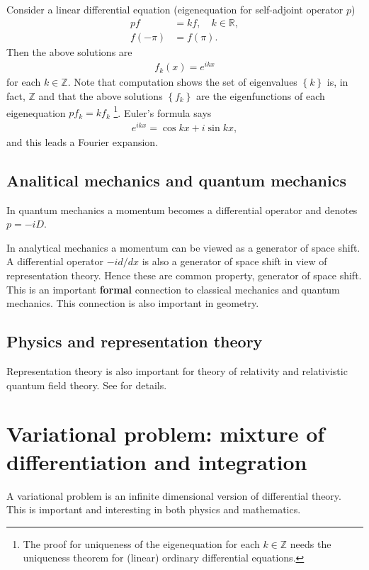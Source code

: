 \documentclass[openany, a4paper, oneside]{jsbook}
\theoremstyle{break}
\theoremstyle{breakdefn}
\newcommand{\cbk}[1]{\left\{#1\right\}}
\newcommand{\bbR}{\mathbb{R}}
\newcommand{\bbZ}{\mathbb{Z}}
\begin{document}
Consider a linear differential equation (eigenequation for
self-adjoint operator $p$)
\begin{align}
 p f
 &=
 k f, \quad k \in \bbR, \\
 f(-\pi)
 &=
 f(\pi).
\end{align}
Then the above solutions are
\begin{align}
 f_k(x)
 =
 e^{ikx}
\end{align}
for each $k \in \bbZ$.
Note that computation shows the set of eigenvalues $\cbk{k}$ is, in fact, $\bbZ$ and that
the above solutions $\cbk{f_k}$ are the eigenfunctions of each eigenequation $p f_k = k f_k$ \footnote{The proof for uniqueness of the eigenequation for each $k \in \bbZ$ needs the
uniqueness theorem for (linear) ordinary differential equations.
 }.
Euler's formula says
\begin{align}
 e^{ikx}
 =
 \cos kx + i \sin kx,
\end{align}
and this leads a Fourier expansion.
\subsection{Analitical mechanics and quantum mechanics}


In quantum mechanics a momentum becomes a differential operator
and denotes $p = -i D$.

In analytical mechanics a momentum
can be viewed as a generator of space shift.
A differential operator $- i d/dx$ is also
a generator of space shift in view of representation theory.
Hence these are common property, generator of space shift.
This is an important \textbf{formal} connection to classical mechanics and quantum mechanics.
This connection is also important in geometry.
\subsection{Physics and representation theory}


Representation theory is also important for
theory of relativity and relativistic quantum field theory.
See \cite{TakeshiHirai1, TakeshiHirai2} for details.
\section{Variational problem: mixture of differentiation and integration}


A variational problem is an infinite dimensional version of differential theory.
This is important and interesting in both physics and mathematics.
\end{document}
